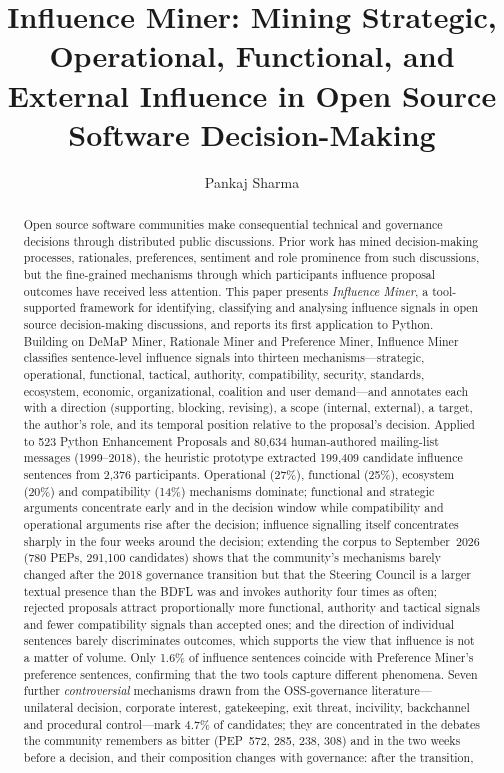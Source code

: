 \documentclass[sigconf,screen]{acmart}
\begin{document}
\title[Influence Miner]{Influence Miner: Mining Strategic, Operational, Functional, and External Influence in Open Source Software Decision-Making}

\author{Pankaj Sharma}

\renewcommand{\shortauthors}{Sharma}

\begin{abstract}
Open source software communities make consequential technical and governance decisions through distributed public discussions. Prior work has mined decision-making processes, rationales, preferences, sentiment and role prominence from such discussions, but the fine-grained mechanisms through which participants influence proposal outcomes have received less attention. This paper presents \emph{Influence Miner}, a tool-supported framework for identifying, classifying and analysing influence signals in open source decision-making discussions, and reports its first application to Python. Building on DeMaP Miner, Rationale Miner and Preference Miner, Influence Miner classifies sentence-level influence signals into thirteen mechanisms---strategic, operational, functional, tactical, authority, compatibility, security, standards, ecosystem, economic, organizational, coalition and user demand---and annotates each with a direction (supporting, blocking, revising), a scope (internal, external), a target, the author's role, and its temporal position relative to the proposal's decision. Applied to 523 Python Enhancement Proposals and 80,634 human-authored mailing-list messages (1999--2018), the heuristic prototype extracted 199,409 candidate influence sentences from 2,376 participants. Operational (27\%), functional (25\%), ecosystem (20\%) and compatibility (14\%) mechanisms dominate; functional and strategic arguments concentrate early and in the decision window while compatibility and operational arguments rise after the decision; influence signalling itself concentrates sharply in the four weeks around the decision; extending the corpus to September~2026 (780 PEPs, 291,100 candidates) shows that the community's mechanisms barely changed after the 2018 governance transition but that the Steering Council is a larger textual presence than the BDFL was and invokes authority four times as often; rejected proposals attract proportionally more functional, authority and tactical signals and fewer compatibility signals than accepted ones; and the direction of individual sentences barely discriminates outcomes, which supports the view that influence is not a matter of volume. Only 1.6\% of influence sentences coincide with Preference Miner's preference sentences, confirming that the two tools capture different phenomena. Seven further \emph{controversial} mechanisms drawn from the OSS-governance literature---unilateral decision, corporate interest, gatekeeping, exit threat, incivility, backchannel and procedural control---mark 4.7\% of candidates; they are concentrated in the debates the community remembers as bitter (PEP~572, 285, 238, 308) and in the two weeks before a decision, and their composition changes with governance: after the transition, 
\end{abstract}
\end{document}
